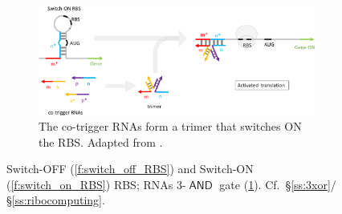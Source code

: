 \documentclass[12pt,notitlepage]{article}
\let\cite\citep
\newcommand{\AND}{\ensuremath{\mathop{\mathsf{AND}}}\xspace}
\begin{document}
\begin{figure}[!p]
    \begin{subfigure}{\linewidth}
        \centering
        \includegraphics[width=\linewidth]{xor_ribocomputing/3_trigger_rna_on}
        \caption{%
            The co-trigger RNAs form a trimer that switches ON the RBS.
            Adapted from
            \cite[\href{https://www.nature.com/articles/nature23271/figures/3}{Fig.~3a}]{GreenETAL2017}.
        }
        \label{f:3_RNA_on_RBS}
    \end{subfigure}
    
    \caption{%
        Switch-OFF (\ref{f:switch_off_RBS})
        and 
        Switch-ON (\ref{f:switch_on_RBS}) RBS;
        RNAs 3-\AND gate (\ref{f:3_RNA_on_RBS}). 
        Cf.~\S\ref{ss:3xor}/\S\ref{ss:ribocomputing}.
    }
    \label{f:switch_RBS}
\end{figure}
\end{document}
